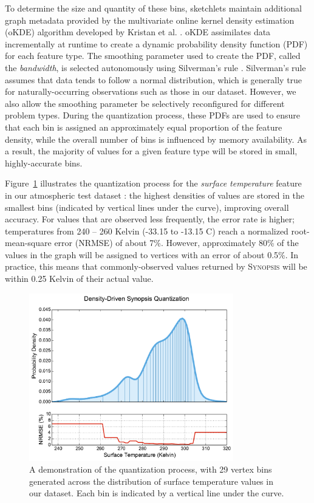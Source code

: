 To determine the size and quantity of these bins, sketchlets maintain additional graph metadata provided by the multivariate online kernel density estimation (oKDE) algorithm developed by Kristan et al. \cite{kristan2011multivariate}. oKDE assimilates data incrementally at runtime to create a dynamic probability density function (PDF) for each feature type. The smoothing parameter used to create the PDF, called the \emph{bandwidth}, is selected autonomously using Silverman's rule \cite{silverman1986density}. Silverman's rule assumes that data tends to follow a normal distribution, which is generally true for naturally-occurring observations such as those in our dataset. However, we also allow the smoothing parameter be selectively reconfigured for different problem types. During the quantization process, these PDFs are used to ensure that each bin is assigned an approximately equal proportion of the feature density, while the overall number of bins is influenced by memory availability. As a result, the majority of values for a given feature type will be stored in small, highly-accurate bins.

Figure~\ref{fig:quantization} illustrates the quantization process for the \emph{surface temperature} feature in our atmospheric test dataset \cite{noaa_nam}: the highest densities of values are stored in the smallest bins (indicated by vertical lines under the curve), improving overall accuracy. For values that are observed less frequently, the error rate is higher; temperatures from 240 -- 260 Kelvin (-33.15 to -13.15 \degree C) reach a normalized root-mean-square error (NRMSE) of about 7\%. However, approximately 80\% of the values in the graph will be assigned to vertices with an error of about 0.5\%. In practice, this means that commonly-observed values returned by \textsc{Synopsis} will be within 0.25 Kelvin of their actual value.

\begin{figure}
    \centerline{\includegraphics[width=3.5in]{figures/quantization.pdf}}
    \caption{A demonstration of the quantization process, with 29 vertex bins generated across the distribution of surface temperature values in our dataset. Each bin is indicated by a vertical line under the curve.}
    \label{fig:quantization}
\end{figure}

